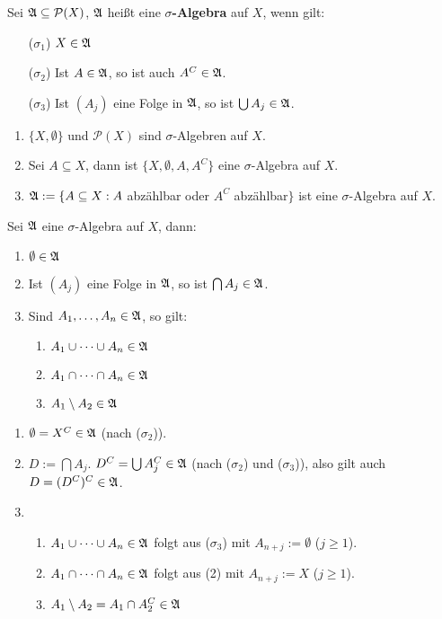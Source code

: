 \documentclass[a4paper,twoside,DIV15,BCOR12mm,chapterprefix=true,headings=onelinechapter]{scrbook}
\begin{document}
\begin{definition}
Sei $\mathfrak{A}\subseteq\mathcal{P}(X)$, $\mathfrak{A}$ heißt eine \textbf{$\sigma$-Algebra} auf $X$, wenn gilt:
\begin{enumerate}
\item[($\sigma_1$)] $X\in\mathfrak{A}$
\item[($\sigma_2$)] Ist $A\in\mathfrak{A}$, so ist auch $A^C\in\mathfrak{A}$.
\item[($\sigma_3$)] Ist $(A_j)$ eine Folge in $\mathfrak{A}$, so ist $\bigcup A_j\in\mathfrak{A}$.
\end{enumerate}
\end{definition}

\begin{beispiel}
\begin{enumerate}
\item $\{X,\emptyset\}$ und $\mathcal{P}(X)$ sind $\sigma$-Algebren auf $X$.
\item Sei $A\subseteq X$, dann ist $\{X,\emptyset, A, A^C\}$ eine $\sigma$-Algebra auf $X$.
\item $\mathfrak{A}:=\{A\subseteq X: A$ abzählbar oder $A^C$ abzählbar$\}$ ist eine $\sigma$-Algebra auf $X$.
\end{enumerate}
\end{beispiel}

\begin{lemma}
Sei $\mathfrak{A}$ eine $\sigma$-Algebra auf $X$, dann:
\begin{enumerate}
\item $\emptyset\in\mathfrak{A}$
\item Ist $(A_j)$ eine Folge in $\mathfrak{A}$, so ist $\bigcap A_j\in\mathfrak{A}$.
\item Sind $A_1,\ldots,A_n\in\mathfrak{A}$, so gilt:
\begin{enumerate}
\item $A_1\cup\cdots\cup A_n\in\mathfrak{A}$
\item $A_1\cap\cdots\cap A_n\in\mathfrak{A}$
\item $A_1\setminus A_2\in\mathfrak{A}$
\end{enumerate}
\end{enumerate}
\end{lemma}

\begin{beweis}
\begin{enumerate}
\item $\emptyset=X^C\in\mathfrak{A}$ (nach ($\sigma_2$)).
\item $D:=\bigcap A_j$. $D^C=\bigcup A_j^C\in\mathfrak{A}$ (nach ($\sigma_2$) und ($\sigma_3$)), also gilt auch $D=(D^C)^C\in\mathfrak{A}$.
\item \begin{enumerate}
\item $A_1\cup\cdots\cup A_n\in\mathfrak{A}$ folgt aus ($\sigma_3$) mit $A_{n+j}:=\emptyset$ ($j\ge 1$).
\item $A_1\cap\cdots\cap A_n\in\mathfrak{A}$ folgt aus (2) mit $A_{n+j}:=X$ ($j\ge 1$).
\item $A_1\setminus A_2=A_1\cap A_2^C\in\mathfrak{A}$
\end{enumerate}
\end{enumerate}
\end{beweis}
\end{document}
